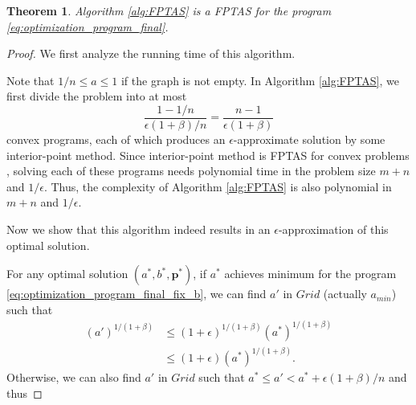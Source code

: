 \documentclass[letterpaper]{article} %
\newtheorem{theorem}{Theorem}
\newcommand{\probdistri}{\mathbf{p}}
\newcommand{\complexbound}{\beta}
\newcommand{\red}[1]{\textcolor{red}{#1}}
\newcommand{\todo}[1]{\red{\textsc{todo:} #1}}
\begin{document}

\begin{theorem}
\label{th:fptas}
  Algorithm \ref{alg:FPTAS} is a FPTAS for the program \eqref{eq:optimization_program_final}.
\end{theorem}

\begin{proof}%
We first analyze the running time of this algorithm.   

  Note that $1/n\le a\le 1$ if the graph is not empty. %
  In Algorithm \ref{alg:FPTAS}, we first divide the problem into at most
  \[\frac{1-1/n}{\epsilon(1+\beta)/n}=\frac{n-1}{\epsilon(1+\complexbound{})}\]
  convex programs, each of which produces an $\epsilon$-approximate solution by some interior-point method. 
  Since interior-point method is FPTAS for convex problems \cite{boyd2004convex}, solving each of these programs needs polynomial time in the problem size $m+n$ and $1/\epsilon$. 
  Thus, the complexity of Algorithm \ref{alg:FPTAS} is also polynomial in $m+n$ and $1/\epsilon$.

Now we show that this algorithm indeed results in an $\epsilon$-approximation of this optimal solution. 

For any optimal solution $(a^*, b^*, \probdistri{}^*)$, 
if $a^*$ achieves minimum for the program 
\eqref{eq:optimization_program_final_fix_b}, we can find $a'$ in $Grid$ (actually $a_{min}$) such that 
  \begin{equation}
  \begin{aligned}
    \label{eq:a_mini_bound}
    (a')^{1/(1+\complexbound{})}&\le (1+\epsilon)^{1/(1+\complexbound{})}(a^*)^{1/(1+\complexbound{})}\\
    &\le (1+\epsilon)(a^*)^{1/(1+\complexbound{})}.
    \end{aligned}
  \end{equation}
  Otherwise, we can also find $a'$ in $Grid$ such that $a^*\le a'<a^*+\epsilon(1+\beta)/n$ and thus


\end{proof}
\end{document}
